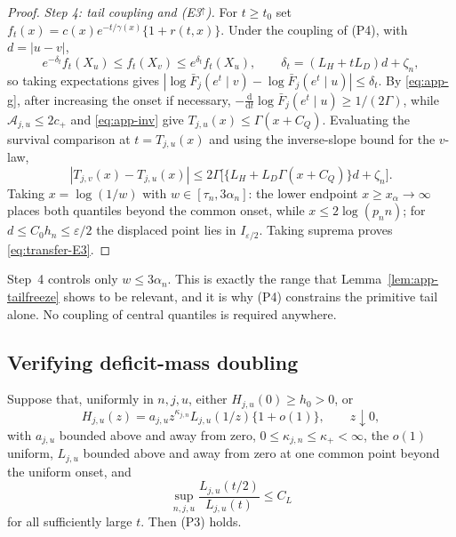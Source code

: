 \begin{proof}
\emph{Step 4: tail coupling and (E3$^\uparrow$).} For $t\ge t_0$ set
$f_t(x)=c(x)e^{-t/\gamma(x)}\{1+r(t,x)\}$. Under the coupling of (P4),
with $d=|u-v|$,
\[
 e^{-\delta_t}f_t(X_u)\le f_t(X_v)\le e^{\delta_t}f_t(X_u),
 \qquad
 \delta_t=(L_H+tL_D)d+\zeta_n,
\]
so taking expectations gives
$|\log\bar F_j(e^t\mid v)-\log\bar F_j(e^t\mid u)|\le\delta_t$. By
\eqref{eq:app-g}, after increasing the onset if necessary,
$-\frac{\mathrm d}{\mathrm dt}\log\bar F_j(e^t\mid u)\ge1/(2\Gamma)$,
while $\mathcal A_{j,u}\le2c_+$ and \eqref{eq:app-inv} give
$T_{j,u}(x)\le\Gamma(x+C_Q)$. Evaluating the survival comparison at
$t=T_{j,u}(x)$ and using the inverse-slope bound for the $v$-law,
\[
 |T_{j,v}(x)-T_{j,u}(x)|
 \le2\Gamma\bigl[\{L_H+L_D\Gamma(x+C_Q)\}d+\zeta_n\bigr].
\]
Taking $x=\log(1/w)$ with $w\in[\tau_n,3\alpha_n]$: the lower endpoint
$x\ge x_\alpha\to\infty$ places both quantiles beyond the common onset,
while $x\le2\log(p_nn)$; for $d\le C_0h_n\le\varepsilon/2$ the displaced
point lies in $I_{\varepsilon/2}$. Taking suprema proves
\eqref{eq:transfer-E3}.
\end{proof}

\begin{remark}
Step~4 controls only $w\le3\alpha_n$. This is exactly the range that
Lemma~\ref{lem:app-tailfreeze} shows to be relevant, and it is why (P4)
constrains the primitive tail alone. No coupling of central quantiles is
required anywhere.
\end{remark}

\subsection{Verifying deficit-mass doubling}

\begin{proposition}
\label{prop:app-doubling}
Suppose that, uniformly in $n,j,u$, either $H_{j,u}(0)\ge h_0>0$, or
\begin{equation}\label{eq:app-margin}
 H_{j,u}(z)=a_{j,u}z^{\kappa_{j,n}}L_{j,u}(1/z)\{1+o(1)\},
 \qquad z\downarrow0,
\end{equation}
with $a_{j,u}$ bounded above and away from zero, $0\le\kappa_{j,n}\le
\kappa_+<\infty$, the $o(1)$ uniform, $L_{j,u}$ bounded above and away
from zero at one common point beyond the uniform onset, and
\begin{equation}\label{eq:app-onestep}
 \sup_{n,j,u}\frac{L_{j,u}(t/2)}{L_{j,u}(t)}\le C_L
\end{equation}
for all sufficiently large $t$. Then (P3) holds.
\end{proposition}

